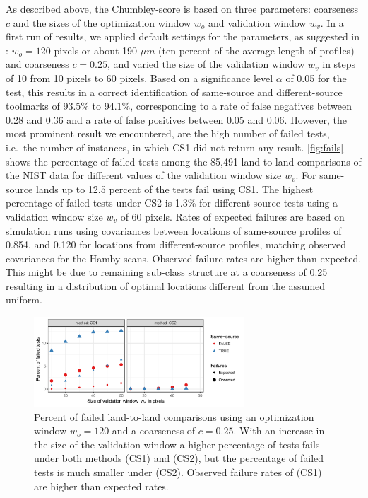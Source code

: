 \documentclass[12pt]{article}
\begin{document}
As described above, the Chumbley-score is based on three parameters:
coarseness \(c\) and the sizes of the optimization window \(w_o\) and
validation window \(w_v\). In a first run of results, we applied default
settings for the parameters, as suggested in \citet{hadler}:
\(w_o = 120\) pixels or about 190 \(\mu m\) (ten percent of the average
length of profiles) and coarseness \(c = 0.25\), and varied the size of
the validation window \(w_v\) in steps of 10 from 10 pixels to 60
pixels. Based on a significance level \(\alpha\) of 0.05 for the test,
this results in a correct identification of same-source and
different-source toolmarks of 93.5\% to 94.1\%, corresponding to a rate
of false negatives between 0.28 and 0.36 and a rate of false positives
between 0.05 and 0.06. However, the most prominent result we
encountered, are the high number of failed tests, i.e.~the number of
instances, in which CS1 did not return any result. \autoref{fig:fails}
shows the percentage of failed tests among the 85,491 land-to-land
comparisons of the NIST data for different values of the validation
window size \(w_v\). For same-source lands up to 12.5 percent of the
tests fail using CS1. The highest percentage of failed tests under CS2
is 1.3\% for different-source tests using a validation window size
\(w_v\) of 60 pixels. Rates of expected failures are based on simulation
runs using covariances between locations of same-source profiles of
0.854, and 0.120 for locations from different-source profiles, matching
observed covariances for the Hamby scans. Observed failure rates are
higher than expected. This might be due to remaining sub-class structure
at a coarseness of 0.25 resulting in a distribution of optimal locations
different from the assumed uniform.

\begin{figure}

{\centering \includegraphics[width=0.7\textwidth]{figures/fails-1} 

}

\caption{Percent of failed land-to-land comparisons using an optimization window $w_o = 120$ and a coarseness of $c = 0.25$. With an increase in the size of the validation window  a higher percentage of tests fails under both methods (CS1) and (CS2), but the percentage of failed tests is much smaller under (CS2). Observed failure rates of (CS1) are higher than expected rates.}\label{fig:fails}
\end{figure}
\end{document}

